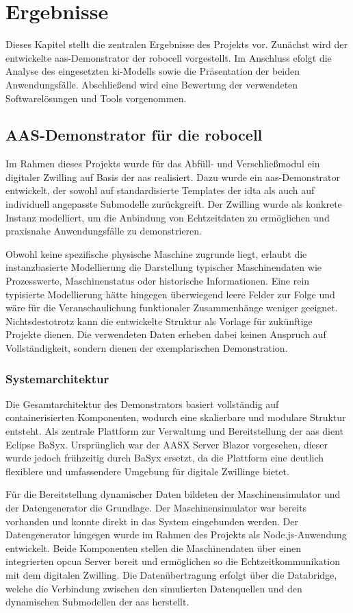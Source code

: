 \newpage
\section{Ergebnisse}
Dieses Kapitel stellt die zentralen Ergebnisse des Projekts vor. 
Zunächst wird der entwickelte \acs{aas}-Demonstrator der robocell vorgestellt.
Im Anschluss efolgt die Analyse des eingesetzten \acs{ki}-Modells sowie die Präsentation der beiden Anwendungsfälle. 
Abschließend wird eine Bewertung der verwendeten Softwarelösungen und Tools vorgenommen.

\subsection{AAS-Demonstrator für die robocell}
Im Rahmen dieses Projekts wurde für das Abfüll- und Verschließmodul ein digitaler Zwilling auf Basis der \acs{aas} realisiert.  
Dazu wurde ein \acs{aas}-Demonstrator entwickelt, der sowohl auf standardisierte Templates der \acs{idta} als auch auf individuell angepasste Submodelle zurückgreift.  
Der Zwilling wurde als konkrete Instanz modelliert, um die Anbindung von Echtzeitdaten zu ermöglichen und praxisnahe Anwendungsfälle zu demonstrieren.

Obwohl keine spezifische physische Maschine zugrunde liegt, erlaubt die instanzbasierte Modellierung die Darstellung typischer Maschinendaten wie Prozesswerte, Maschinenstatus oder historische Informationen.  
Eine rein typisierte Modellierung hätte hingegen überwiegend leere Felder zur Folge und wäre für die Veranschaulichung funktionaler Zusammenhänge weniger geeignet.  
Nichtsdestotrotz kann die entwickelte Struktur als Vorlage für zukünftige Projekte dienen.  
Die verwendeten Daten erheben dabei keinen Anspruch auf Vollständigkeit, sondern dienen der exemplarischen Demonstration.

\subsubsection{Systemarchitektur}
Die Gesamtarchitektur des Demonstrators basiert vollständig auf containerisierten Komponenten, wodurch eine skalierbare und modulare Struktur entsteht. 
Als zentrale Plattform zur Verwaltung und Bereitstellung der \acs{aas} dient Eclipse BaSyx. 
Ursprünglich war der AASX Server Blazor vorgesehen, dieser wurde jedoch frühzeitig durch BaSyx ersetzt, da die Plattform eine deutlich flexiblere und umfassendere Umgebung für digitale Zwillinge bietet.

Für die Bereitstellung dynamischer Daten bildeten der Maschinensimulator und der Datengenerator die Grundlage.
Der Maschinensimulator war bereits vorhanden und konnte direkt in das System eingebunden werden. 
Der Datengenerator hingegen wurde im Rahmen des Projekts als Node.js-Anwendung entwickelt. 
Beide Komponenten stellen die Maschinendaten über einen integrierten \acs{opcua} Server bereit und ermöglichen so die Echtzeitkommunikation mit dem digitalen Zwilling. 
Die Datenübertragung erfolgt über die Databridge, welche die Verbindung zwischen den simulierten Datenquellen und den dynamischen Submodellen der \acs{aas} herstellt.

